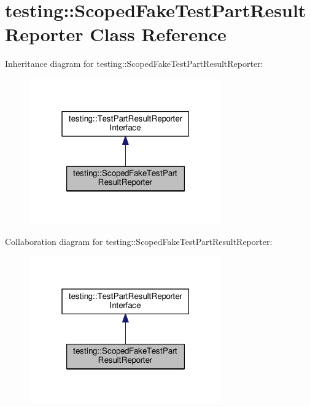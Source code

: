 \hypertarget{classtesting_1_1_scoped_fake_test_part_result_reporter}{}\section{testing\+:\+:Scoped\+Fake\+Test\+Part\+Result\+Reporter Class Reference}
\label{classtesting_1_1_scoped_fake_test_part_result_reporter}


Inheritance diagram for testing\+:\+:Scoped\+Fake\+Test\+Part\+Result\+Reporter\+:
\nopagebreak
\begin{figure}[H]
\begin{center}
\leavevmode
\includegraphics[width=235pt]{classtesting_1_1_scoped_fake_test_part_result_reporter__inherit__graph}
\end{center}
\end{figure}


Collaboration diagram for testing\+:\+:Scoped\+Fake\+Test\+Part\+Result\+Reporter\+:
\nopagebreak
\begin{figure}[H]
\begin{center}
\leavevmode
\includegraphics[width=235pt]{classtesting_1_1_scoped_fake_test_part_result_reporter__coll__graph}
\end{center}
\end{figure}
